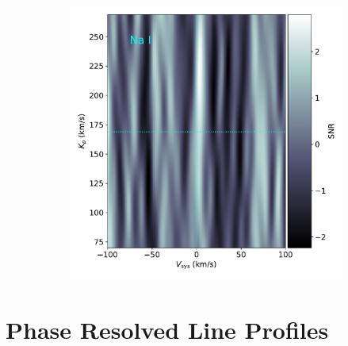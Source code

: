 \documentclass[twocolumn]{aastex631}
\begin{document}
\begin{figure}[ht!]
\begin{subfigure}[b]{0.3\textwidth}
            \end{subfigure}
            \begin{subfigure}[b]{0.3\textwidth}
                \centering
                \includegraphics[width=\textwidth]{plots-updated/kp-vsys-map/combined/KELT-20b.20190504.combined.Na.CCFs-shifted.pdf}
            \end{subfigure}
            \caption{}
            \label{fig:fig}
        \end{figure}

    \section{Phase Resolved Line Profiles}
    
        
\end{document}
